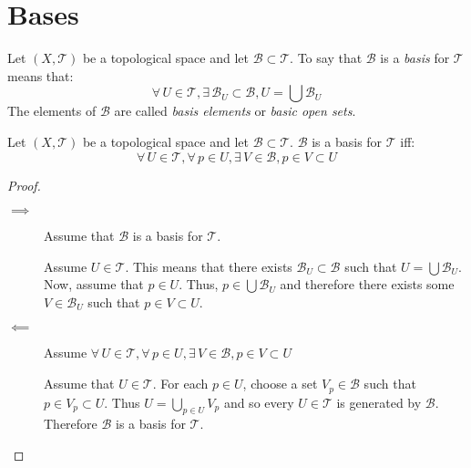 \documentclass[letterpaper,12pt,fleqn]{article}
\newcommand{\T}{\mathscr{T}}
\newcommand{\B}{\mathcal{B}}
\begin{document}
\section*{Bases}

\begin{definition}[Basis]
  Let \((X,\T)\) be a topological space and let \(\B\subset\T\).  To say that \(\B\) is a \emph{basis} for \(\T\)
  means that:
  \[\forall\,U\in\T,\exists\,\B_U\subset\B,U=\bigcup\B_U\]
  The elements of \(\B\) are called \emph{basis elements} or \emph{basic open sets}.
\end{definition}

\begin{theorem}
  Let \((X,\T)\) be a topological space and let \(\B\subset\T\).  \(\B\) is a basis for \(\T\) iff:
  \[\forall\,U\in\T,\forall\,p\in U,\exists\,V\in\B,p\in V\subset U\]
\end{theorem}

\begin{proof}
  \begin{description}
  \item[]
  \item[\(\implies\)] Assume that \(\B\) is a basis for \(\T\).

    Assume \(U\in\T\).  This means that there exists \(\B_U\subset\B\) such that \(U=\bigcup\B_U\).  Now, assume
    that \(p\in U\).  Thus, \(p\in\bigcup\B_U\) and therefore there exists some \(V\in\B_U\) such that
    \(p\in V\subset U\).

  \item[\(\impliedby\)] Assume \(\forall\,U\in\T,\forall\,p\in U,\exists\,V\in\B,p\in V\subset U\)

    Assume that \(U\in\T\).  For each \(p\in U\), choose a set \(V_p\in\B\) such that \(p\in V_p\subset U\).  Thus
    \(U=\bigcup_{p\in U}V_p\) and so every \(U\in\T\) is generated by \(\B\).  Therefore \(\B\) is a basis for
    \(\T\).
  \end{description}
\end{proof}
\end{document}
